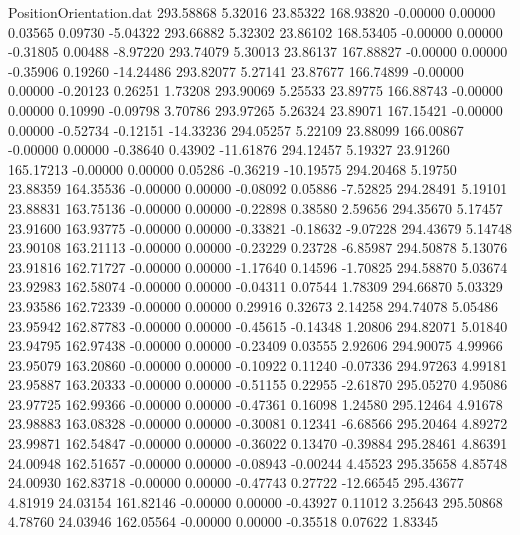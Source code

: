 \begin{filecontents}{PositionOrientation.dat}
 293.58868    5.32016   23.85322   168.93820   -0.00000    0.00000    0.03565    0.09730   -5.04322
 293.66882    5.32302   23.86102   168.53405   -0.00000    0.00000   -0.31805    0.00488   -8.97220
 293.74079    5.30013   23.86137   167.88827   -0.00000    0.00000   -0.35906    0.19260  -14.24486
 293.82077    5.27141   23.87677   166.74899   -0.00000    0.00000   -0.20123    0.26251    1.73208
 293.90069    5.25533   23.89775   166.88743   -0.00000    0.00000    0.10990   -0.09798    3.70786
 293.97265    5.26324   23.89071   167.15421   -0.00000    0.00000   -0.52734   -0.12151  -14.33236
 294.05257    5.22109   23.88099   166.00867   -0.00000    0.00000   -0.38640    0.43902  -11.61876
 294.12457    5.19327   23.91260   165.17213   -0.00000    0.00000    0.05286   -0.36219  -10.19575
 294.20468    5.19750   23.88359   164.35536   -0.00000    0.00000   -0.08092    0.05886   -7.52825
 294.28491    5.19101   23.88831   163.75136   -0.00000    0.00000   -0.22898    0.38580    2.59656
 294.35670    5.17457   23.91600   163.93775   -0.00000    0.00000   -0.33821   -0.18632   -9.07228
 294.43679    5.14748   23.90108   163.21113   -0.00000    0.00000   -0.23229    0.23728   -6.85987
 294.50878    5.13076   23.91816   162.71727   -0.00000    0.00000   -1.17640    0.14596   -1.70825
 294.58870    5.03674   23.92983   162.58074   -0.00000    0.00000   -0.04311    0.07544    1.78309
 294.66870    5.03329   23.93586   162.72339   -0.00000    0.00000    0.29916    0.32673    2.14258
 294.74078    5.05486   23.95942   162.87783   -0.00000    0.00000   -0.45615   -0.14348    1.20806
 294.82071    5.01840   23.94795   162.97438   -0.00000    0.00000   -0.23409    0.03555    2.92606
 294.90075    4.99966   23.95079   163.20860   -0.00000    0.00000   -0.10922    0.11240   -0.07336
 294.97263    4.99181   23.95887   163.20333   -0.00000    0.00000   -0.51155    0.22955   -2.61870
 295.05270    4.95086   23.97725   162.99366   -0.00000    0.00000   -0.47361    0.16098    1.24580
 295.12464    4.91678   23.98883   163.08328   -0.00000    0.00000   -0.30081    0.12341   -6.68566
 295.20464    4.89272   23.99871   162.54847   -0.00000    0.00000   -0.36022    0.13470   -0.39884
 295.28461    4.86391   24.00948   162.51657   -0.00000    0.00000   -0.08943   -0.00244    4.45523
 295.35658    4.85748   24.00930   162.83718   -0.00000    0.00000   -0.47743    0.27722  -12.66545
 295.43677    4.81919   24.03154   161.82146   -0.00000    0.00000   -0.43927    0.11012    3.25643
 295.50868    4.78760   24.03946   162.05564   -0.00000    0.00000   -0.35518    0.07622    1.83345

\end{filecontents}
